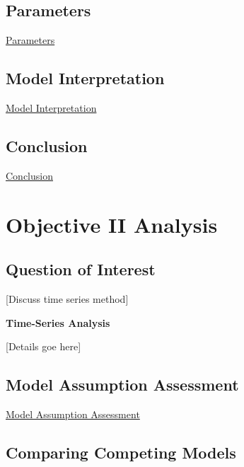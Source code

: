 \documentclass[american,]{article}
\begin{document}
\newpage

\hypertarget{parameters}{%
\subsection{Parameters}\label{parameters}}

\protect\hyperlink{parameters}{Parameters}

\hypertarget{model-interpretation}{%
\subsection{Model Interpretation}\label{model-interpretation}}

\protect\hyperlink{model-interpretation}{Model Interpretation}

\hypertarget{conclusion}{%
\subsection{Conclusion}\label{conclusion}}

\protect\hyperlink{conclusion-1}{Conclusion}

\newpage

\hypertarget{objective-ii-analysis}{%
\section{Objective II Analysis}\label{objective-ii-analysis}}

\hypertarget{question-of-interest-1}{%
\subsection{Question of Interest}\label{question-of-interest-1}}

{[}Discuss time series method{]}

\textbf{Time-Series Analysis}

{[}Details goe here{]}

\hypertarget{model-assumption-assessment}{%
\subsection{Model Assumption Assessment}\label{model-assumption-assessment}}

\protect\hyperlink{model-assumption-assessment}{Model Assumption Assessment}

\hypertarget{comparing-competing-models-1}{%
\subsection{Comparing Competing Models}\label{comparing-competing-models-1}}
\end{document}
